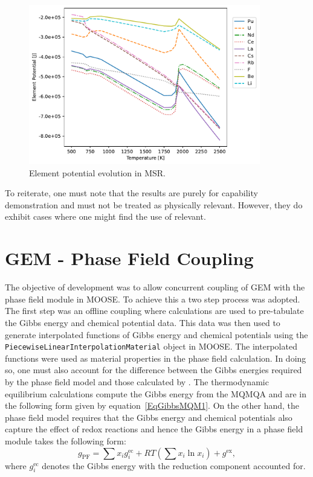     \begin{figure}[ht]
        \centering
        \includegraphics[width=0.9\textwidth]{figures/chapter-7/msr_ep.pdf}
        \caption{Element potential evolution in MSR.}
        \label{fig:res_epmsr}
     \end{figure}
To reiterate, one must note that the results are purely for capability demonstration and must not be treated as physically relevant. However, they do exhibit cases where one might find the use of {\GEM} relevant.

\section{GEM - Phase Field Coupling}\label{sec:gem_pf}
The objective of {\YJ} development was to allow concurrent coupling of GEM with the phase field module in MOOSE. To achieve this a two step process was adopted. The first step was an offline coupling where {\GEM} calculations are used to pre-tabulate the Gibbs energy and chemical potential data. This data was then used to generate interpolated functions of Gibbs energy and chemical potentials using the \texttt{PiecewiseLinearInterpolationMaterial} object in MOOSE. The interpolated functions were used as material properties in the phase field calculation. In doing so, one must also account for the difference between the Gibbs energies required by the phase field model and those calculated by {\GEM}. The thermodynamic equilibrium calculations compute the Gibbs energy from the MQMQA and are in the following form given by equation~\eqref{EqGibbsMQM1}. On the other hand, the phase field model requires that the Gibbs energy and chemical potentials also capture the effect of redox reactions and hence the Gibbs energy in a phase field module takes the following form:
\begin{equation}
	g_\text{PF} = \sum x_i g_i^\text{ec}  + RT\left( \sum x_i \ln{x_i} \right) + g^\text{ex},
\end{equation}
where $g_i^\text{ec}$ denotes the Gibbs energy with the reduction component accounted for. 

